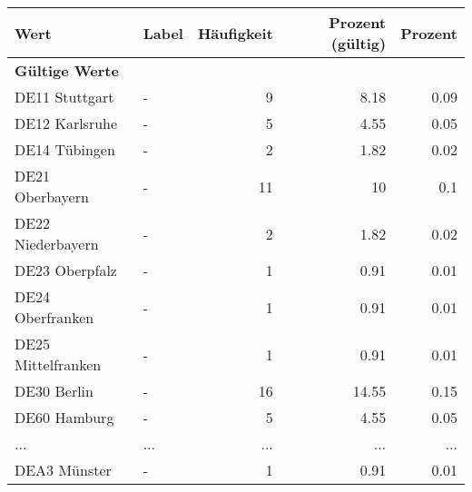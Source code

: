      \begin{longtable}{Xlrrr}
     \toprule
     \textbf{Wert} & \textbf{Label} & \textbf{Häufigkeit} & \textbf{Prozent (gültig)} & \textbf{Prozent} \\
     \endhead
     \midrule
     \multicolumn{5}{l}{\textbf{Gültige Werte}}\\
        \multicolumn{1}{X}{DE11 Stuttgart} & - & \num{9} & \num[round-mode=places,round-precision=2]{8.18} & \num[round-mode=places,round-precision=2]{0.09} \\
        \multicolumn{1}{X}{DE12 Karlsruhe} & - & \num{5} & \num[round-mode=places,round-precision=2]{4.55} & \num[round-mode=places,round-precision=2]{0.05} \\
        \multicolumn{1}{X}{DE14 Tübingen} & - & \num{2} & \num[round-mode=places,round-precision=2]{1.82} & \num[round-mode=places,round-precision=2]{0.02} \\
        \multicolumn{1}{X}{DE21 Oberbayern} & - & \num{11} & \num[round-mode=places,round-precision=2]{10} & \num[round-mode=places,round-precision=2]{0.1} \\
        \multicolumn{1}{X}{DE22 Niederbayern} & - & \num{2} & \num[round-mode=places,round-precision=2]{1.82} & \num[round-mode=places,round-precision=2]{0.02} \\
        \multicolumn{1}{X}{DE23 Oberpfalz} & - & \num{1} & \num[round-mode=places,round-precision=2]{0.91} & \num[round-mode=places,round-precision=2]{0.01} \\
        \multicolumn{1}{X}{DE24 Oberfranken} & - & \num{1} & \num[round-mode=places,round-precision=2]{0.91} & \num[round-mode=places,round-precision=2]{0.01} \\
        \multicolumn{1}{X}{DE25 Mittelfranken} & - & \num{1} & \num[round-mode=places,round-precision=2]{0.91} & \num[round-mode=places,round-precision=2]{0.01} \\
        \multicolumn{1}{X}{DE30 Berlin} & - & \num{16} & \num[round-mode=places,round-precision=2]{14.55} & \num[round-mode=places,round-precision=2]{0.15} \\
        \multicolumn{1}{X}{DE60 Hamburg} & - & \num{5} & \num[round-mode=places,round-precision=2]{4.55} & \num[round-mode=places,round-precision=2]{0.05} \\
       ... & ... & ... & ... & ... \\
        \multicolumn{1}{X}{DEA3 Münster} & - & \num{1} & \num[round-mode=places,round-precision=2]{0.91} & \num[round-mode=places,round-precision=2]{0.01} \\

\end{longtable}
